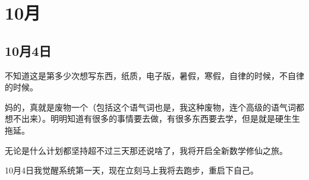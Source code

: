 

\section{10月}

\subsection{10月4日}
不知道这是第多少次想写东西，纸质，电子版，暑假，寒假，自律的时候，不自律的时候。

妈的，真就是废物一个（包括这个语气词也是，我这种废物，连个高级的语气词都想不出来）。明明知道有很多的事情要去做，有很多东西要去学，但是就是硬生生拖延。

无论是什么计划都坚持超不过三天那还说啥了，我将开启全新数学修仙之旅。

10月4日我觉醒系统第一天，现在立刻马上我将去跑步，重启下自己。